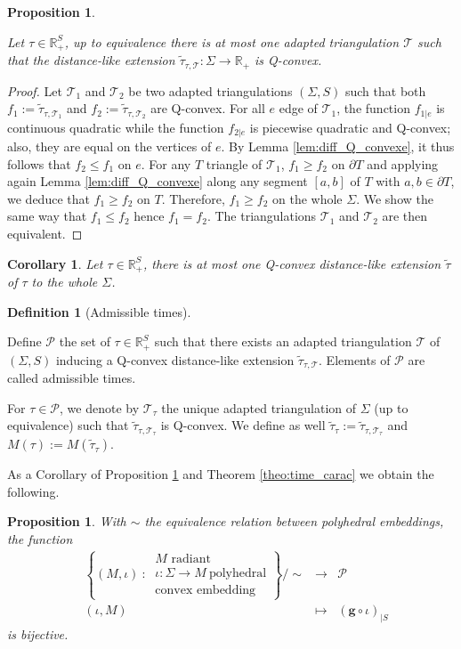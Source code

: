 \documentclass[a4paper,12pt]{article}
\def\TT{\mathcal T}
\def\adm{\P}
\def\RR{\mathbb{R}}
\def\quadform{\mathbf{g}}
\def\adm{\mathcal{P}}
\def\P{\mathcal{P}}
\newcommand{\functionn}[4]{\displaystyle\begin{array}{l|rcl}
& \displaystyle #1 & \longrightarrow & \displaystyle #2 \\
	& \displaystyle #3 & \longmapsto & \displaystyle #4 \end{array}}
\newcommand{\tautilde}[2]{\widetilde\tau_{#1,#2}}
\newtheorem{prop}[lem]{Proposition}
\newtheorem{cor}[lem]{Corollary}
\theoremstyle{definition}
\newtheorem{defi}[lem]{Definition}	%
\begin{document}
					\begin{prop} \label{prop:unique_Q_convexe}

					Let $\tau\in \RR_+^{S}$, up to equivalence there is at most one adapted triangulation $\TT$ 
						such that the distance-like extension $\tautilde{\tau}{\TT}: \Sigma\rightarrow \RR_+$ is Q-convex.
					\end{prop}
					\begin{proof}
					 Let $\TT_1$ and $\TT_2$ be two adapted triangulations $(\Sigma, S)$ such that both $f_1:=\tautilde{\tau}{\TT_1}$
					 and $f_2:=\tautilde{\tau}{\TT_2}$ are Q-convex.
					 For all $e$ edge of $\TT_1$, the function $f_{1|e}$ is continuous quadratic while
					 the function $f_{2|e}$ is piecewise quadratic and Q-convex; also, they are equal on the vertices of $e$.
					 By Lemma \ref{lem:diff_Q_convexe}, it thus follows that $f_2\leq f_1$ on $e$.
					 For any $T$ triangle of $\TT_1$, $f_1\geq f_2$ on $\partial T$ and applying again Lemma \ref{lem:diff_Q_convexe}
					 along any segment $[a,b]$ of $T$ with $a,b\in \partial T$, we deduce that $f_1\geq f_2$ on $T$. Therefore, $f_1\geq f_2$ on the whole $\Sigma$. We show the same way that $f_1\leq f_2$ hence $f_1=f_2$. The triangulations $\TT_1$ and $\TT_2$ are then equivalent.\end{proof}
					\begin{cor}
					 Let $\tau\in \RR_+^{S}$, there is at most one Q-convex distance-like extension $\widetilde\tau$ of $\tau$ to the whole $\Sigma$.
					\end{cor}

					\begin{defi}[Admissible times] \label{defi:temps_admissbles}

						Define $\adm$ the set of $\tau\in \RR_+^{S}$ such that there exists an adapted triangulation $\TT$ of $(\Sigma, S)$ inducing a Q-convex distance-like extension $\tautilde{\tau}{\TT}$. Elements of $\adm$ are called admissible times.

						For $\tau \in \adm$, we denote by $\TT_\tau$ the unique adapted triangulation of 
						 $\Sigma$ (up to equivalence) such that $\tautilde{\tau}{\TT_\tau}$ is Q-convex. We define as well $\widetilde\tau_\tau:= \tautilde{\tau}{\TT_\tau}$ and $M(\tau):=M(\widetilde\tau_\tau)$.

					\end{defi}
					As a Corollary of Proposition \ref{prop:unique_Q_convexe} and Theorem \ref{theo:time_carac} we obtain the following.
					\begin{prop}\label{prop:plong_conv} With $\sim$ the equivalence relation between polyhedral embeddings, the function
					 $$ \functionn{ \left\{(M,\iota) ~:~ \begin{array}{c}M \text{ radiant}\\
												 \iota:\Sigma\rightarrow M ~\text{polyhedral} \\ \text{convex embedding} 
												 \end{array}
\right\}/\sim }{\adm}{(\iota,M)}{\left(\quadform\circ \iota\right)_{|S} }$$
					 is bijective.
					\end{prop}
\end{document}
